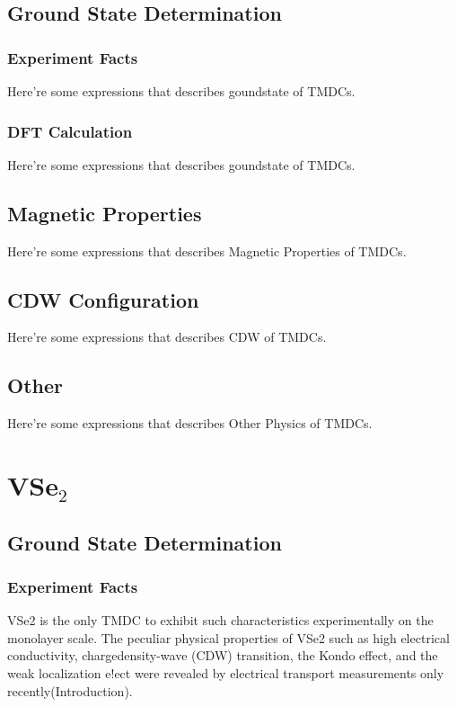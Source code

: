 \section{Ground State Determination}
\subsection{Experiment Facts}
Here're some expressions that describes goundstate of TMDCs.

\subsection{DFT Calculation}
Here're some expressions that describes goundstate of TMDCs.

\section{Magnetic Properties}
Here're some expressions that describes Magnetic Properties of TMDCs.

\section{CDW Configuration}
Here're some expressions that describes CDW of TMDCs.

\section{Other}
Here're some expressions that describes Other Physics of TMDCs.

\chapter{VSe$_2$}

\section{Ground State Determination}
\subsection{Experiment Facts}
VSe2 is the only TMDC to exhibit such characteristics experimentally on the monolayer scale. The peculiar physical properties of VSe2 such as high electrical conductivity, chargedensity-wave (CDW) transition, the Kondo effect, and the weak localization e!ect were revealed by electrical transport measurements only recently(Introduction). 
